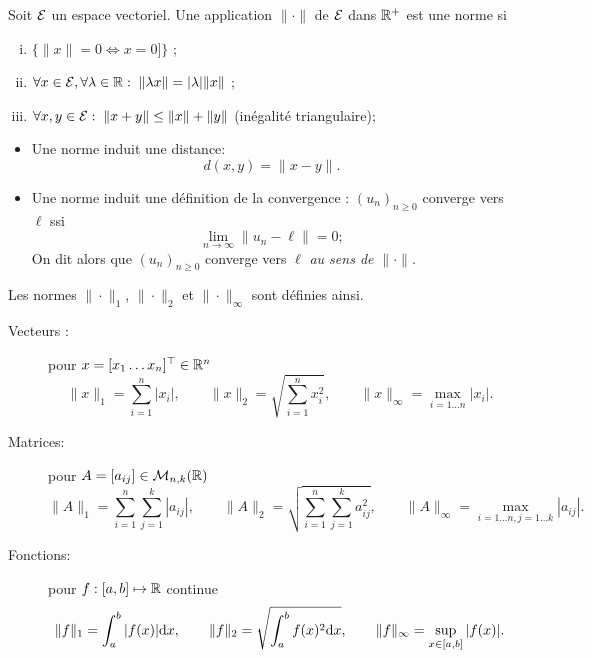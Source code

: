 \begin{definition}[Norme]
  Soit $\mathcal{E}$ un espace vectoriel. Une application $\|\cdot\|$ de $\mathcal{E}$ dans $\mathbb{R}^+$ est une norme si
  \begin{enumerate}[(i)]
    \item $\{\|x\| = 0 \Leftrightarrow x = 0]\}$ ;
    \item $\forall x \in \mathcal{E}, \forall \lambda \in \mathbb{R}: \; \|\lambda x\| = |\lambda| \|x\|$ ;
    \item $\forall x, y \in \mathcal{E}: \; \|x+y\| \leq \|x\| + \|y\|$ (inégalité triangulaire);
  \end{enumerate}
\end{definition}

\remarks
\begin{itemize}
  \item Une norme induit une distance:
  $$
  d(x, y) = \|x - y\|.
  $$
  \item Une norme induit une définition de la convergence : $(u_n)_{n \geq 0}$ converge vers $\ell$ ssi
  $$
  \lim_{n \to \infty} \|u_n - \ell\| = 0;
  $$
  On dit alors que $(u_n)_{n \geq 0}$ converge vers $\ell$ {\em au sens de $\|\cdot\|$}.
\end{itemize}

\begin{definition}
  Les normes $\|\cdot\|_1$, $\|\cdot\|_2$ et $\|\cdot\|_\infty$ sont définies ainsi.
  \begin{description}
    \item[Vecteurs :] pour $x = [x_1 \dots x_n]^\top \in \mathbb{R}^n$
    $$
    \|x\|_1 = \sum_{i=1}^n |x_i|, \qquad 
    \|x\|_2 = \sqrt{\sum_{i=1}^n x_i^2}, \qquad 
    \|x\|_\infty = \max_{i = 1 \dots n} |x_i|. 
    $$
    \item[Matrices:] pour $A = [a_{ij}] \in \mathcal{M}_{n, k}(\mathbb{R})$
    $$
    \|A\|_1 = \sum_{i=1}^n \sum_{j=1}^k |a_{ij}|, \qquad 
    \|A\|_2 = \sqrt{\sum_{i=1}^n \sum_{j=1}^k a_{ij}^2}, \qquad 
    \|A\|_\infty = \max_{i = 1 \dots n, j = 1 \dots k} |a_{ij}|. 
    $$
    \item[Fonctions:] pour $f : [a, b] \mapsto \mathbb{R}$ continue
    $$
    \|f\|_1 = \int_a^b |f(x)| \text{d} x, \qquad 
    \|f\|_2 = \sqrt{\int_a^b f(x)^2 \text{d} x}, \qquad 
    \|f\|_\infty = \sup_{x \in [a, b]} |f(x)|.
    $$
  \end{description}
\end{definition}

